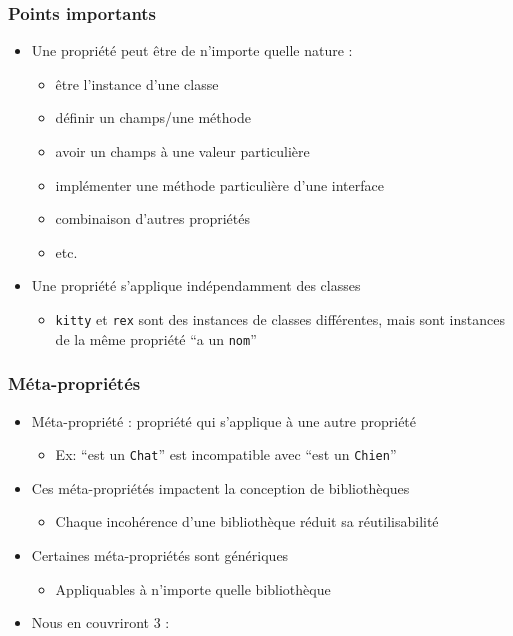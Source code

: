 \documentclass[draft]{beamer}
\DeclareRobustCommand{\todo}[1]{\ifdraft{\textbf{\textcolor{red}{[#1]}}}{}}
\begin{document}
\begin{frame}
\frametitle{Points importants}
\begin{itemize}
 \item Une propriété peut être de n'importe quelle nature :
 \begin{itemize}
  \item être l'instance d'une classe
  \item définir un champs/une méthode
  \item avoir un champs à une valeur particulière
  \item implémenter une méthode particulière d'une interface
  \item combinaison d'autres propriétés
  \item etc.
 \end{itemize}
 \item Une propriété s'applique indépendamment des classes
 \begin{itemize}
  \item \lstinline{kitty} et \lstinline{rex} sont des instances de classes différentes, mais sont instances de la même propriété ``a un \lstinline{nom}''
 \end{itemize}
\end{itemize}
\end{frame}

\begin{frame}
\frametitle{Méta-propriétés}
\begin{itemize}
 \item Méta-propriété : propriété qui s'applique à une autre propriété
 \begin{itemize}
  \item Ex: ``est un \lstinline{Chat}'' est incompatible avec ``est un \lstinline{Chien}''
 \end{itemize}
 \item Ces méta-propriétés impactent la conception de bibliothèques
 \begin{itemize}
  \item Chaque incohérence d'une bibliothèque réduit sa réutilisabilité
 \end{itemize}
 \item Certaines méta-propriétés sont génériques
 \begin{itemize}
  \item Appliquables à n'importe quelle bibliothèque
 \end{itemize}
 \item Nous en couvriront 3 :
\end{itemize}
\end{frame}
\end{document}
